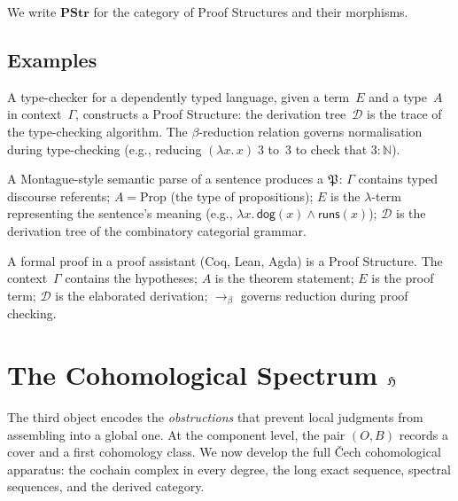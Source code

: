 We write $\mathbf{PStr}$ for the category of Proof Structures and their
morphisms.

\section{Examples}

\begin{example}
\label{ex:type-checking}
A type-checker for a dependently typed language, given a term~$E$ and a
type~$A$ in context~$\Gamma$, constructs a Proof Structure: the
derivation tree~$\mathcal{D}$ is the trace of the type-checking
algorithm.  The $\beta$-reduction relation governs normalisation during
type-checking (e.g., reducing $(\lambda x.\,x)\;3$ to~$3$ to
check that $3 : \mathbb{N}$).
\end{example}

\begin{example}
\label{ex:semantic-parse}
A Montague-style semantic parse of a sentence produces a $\mathfrak{P}$:
$\Gamma$ contains typed discourse referents;
$A = \mathrm{Prop}$ (the type of propositions);
$E$ is the $\lambda$-term
representing the sentence's meaning (e.g., $\lambda x.\,
\mathsf{dog}(x) \wedge \mathsf{runs}(x)$);
$\mathcal{D}$ is the derivation tree of the combinatory categorial
grammar.
\end{example}

\begin{example}
\label{ex:formal-proof}
A formal proof in a proof assistant (Coq, Lean, Agda) is a Proof
Structure.  The context~$\Gamma$ contains the hypotheses; $A$ is the
theorem statement; $E$ is the proof term; $\mathcal{D}$ is the
elaborated derivation; $\to_\beta$ governs reduction during proof
checking.
\end{example}

\chapter{The Cohomological Spectrum \texorpdfstring{$\mathfrak{H}$}{H}}
\label{ch:cspec}

The third object encodes the \emph{obstructions} that prevent local
judgments from assembling into a global one.  At the component level,
the pair $(O,B)$ records a cover and a first cohomology class.  We now
develop the full \v{C}ech cohomological apparatus: the cochain
complex in every degree, the long exact sequence, spectral sequences,
and the derived category.

